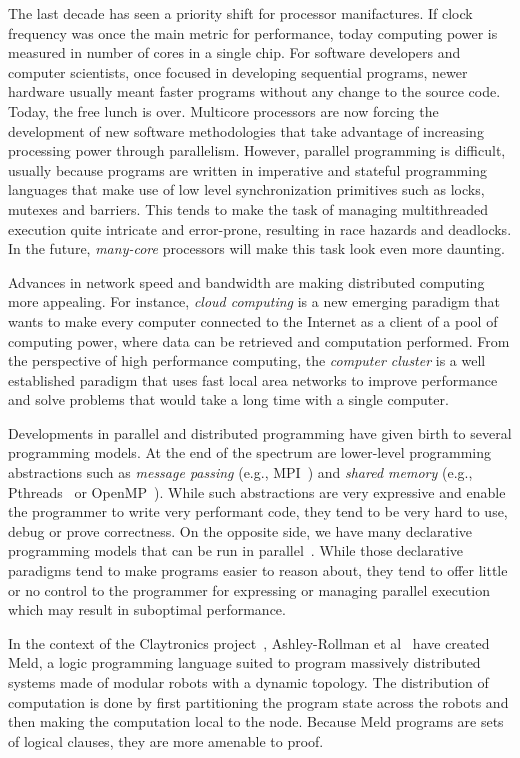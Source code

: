 
The last decade has seen a priority shift for processor manifactures. If clock frequency
was once the main metric for performance, today computing power is measured in number of
cores in a single chip.
For software developers and computer scientists, once focused in developing sequential programs,
newer hardware usually meant faster programs without any change to the source code. Today,
the free lunch is over. Multicore processors are now forcing the development of
new software methodologies that take advantage of increasing processing power through parallelism.
However, parallel programming is difficult, usually because programs are written
in imperative and stateful programming languages that make use of low level synchronization
primitives such as locks, mutexes and barriers. This tends to make the task of managing multithreaded
execution quite intricate and error-prone, resulting in race hazards and deadlocks.
In the future, \emph{many-core} processors will make this task look even more daunting.

Advances in network speed and bandwidth are making distributed computing
more appealing. For instance, \emph{cloud computing} is a new emerging paradigm that wants
to make every computer connected to the Internet as a client of a pool of computing power,
where data can be retrieved and computation performed. From the perspective of high performance
computing, the \emph{computer cluster} is a well established paradigm that uses fast local area
networks to improve performance and solve problems that would take a long time with a single computer.

Developments in parallel and distributed programming have given birth to several programming models.
At the end of the spectrum are lower-level programming abstractions such as
\emph{message passing} (e.g., MPI~\cite{gabriel04-open-mpi}) and \emph{shared memory}
(e.g., Pthreads~\cite{Butenhof:1997:PPT:263953} or OpenMP~\cite{Chapman-2007-UOP-1370966}).
While such abstractions are very expressive and enable the programmer to write very performant code,
they tend to be very hard to use, debug or prove correctness.
On the opposite side, we have many declarative programming models
that can be run in parallel~\cite{Blelloch:1996:PPA:227234.227246}.
While those declarative paradigms tend to make programs easier to reason about, they tend to offer
little or no control to the programmer for expressing or managing parallel execution
which may result in suboptimal performance.

In the context of the Claytronics project~\cite{goldstein-computer05}, Ashley-Rollman et
al~\cite{ashley-rollman-iclp09, ashley-rollman-derosa-iros07wksp} have created Meld, a logic programming language suited to
program massively distributed systems made of modular robots with a dynamic topology. The distribution of computation is done
by first partitioning the program
state across the robots and then making the computation local to the node. Because Meld programs
are sets of logical clauses, they are more amenable to proof.


